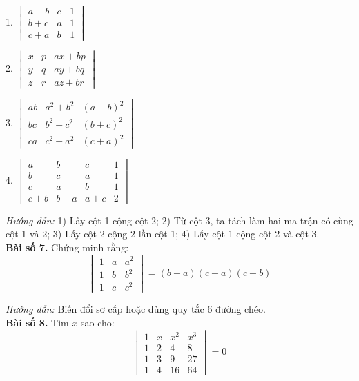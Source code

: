 1. \(\begin{vmatrix}
a + b & c & 1 \\
b + c & a & 1 \\
c + a & b & 1
\end{vmatrix}\)
\vspace*{0.5cm}

2. \(\begin{vmatrix}
x & p & ax + bp \\
y & q & ay + bq \\
z & r & az + br
\end{vmatrix}\)
\vspace*{0.5cm}

3. \(\begin{vmatrix}
    ab & a^2 + b^2 & (a + b)^2 \\
    bc & b^2 + c^2 & (b + c)^2 \\
    ca & c^2 + a^2 & (c + a)^2
    \end{vmatrix}\)
    \vspace*{0.5cm}
    
    4. \(\begin{vmatrix}
    a & b & c & 1 \\
    b & c & a & 1 \\
    c & a & b & 1 \\
    c + b & b + a & a + c & 2
    \end{vmatrix}\)
    \vspace*{0.5cm}
    
    \textit{Hướng dẫn:}
    1) Lấy cột 1 cộng cột 2;
    2) Từ cột 3, ta tách làm hai ma trận có cùng cột 1 và 2;
    3) Lấy cột 2 cộng 2 lần cột 1;
    4) Lấy cột 1 cộng cột 2 và cột 3.\\
\textbf{Bài số 7.} Chứng minh rằng:
    \[
    \begin{vmatrix}
    1 & a & a^2 \\
    1 & b & b^2 \\
    1 & c & c^2
    \end{vmatrix} = (b - a)(c - a)(c - b)
    \]
    
    \textit{Hướng dẫn:} Biến đổi sơ cấp hoặc dùng quy tắc 6 đường chéo.\\
\textbf{Bài số 8.} Tìm \(x\) sao cho:
    \[
    \begin{vmatrix}
    1 & x & x^2 & x^3 \\
    1 & 2 & 4 & 8 \\
    1 & 3 & 9 & 27 \\
    1 & 4 & 16 & 64
    \end{vmatrix} = 0
    \]
    
